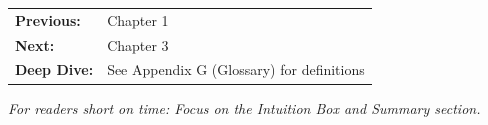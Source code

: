 \begin{tcolorbox}[
    colback=green!5!white,
    colframe=green!75!black,
    title={\textbf{Reading Path}},
    fonttitle=\bfseries
]
\begin{tabular}{@{}ll@{}}
\textbf{Previous:} & Chapter 1 \\
\textbf{Next:} & Chapter 3 \\
\textbf{Deep Dive:} & See Appendix G (Glossary) for definitions \\
\end{tabular}

\medskip
\textit{For readers short on time: Focus on the Intuition Box and Summary section.}
\end{tcolorbox}

